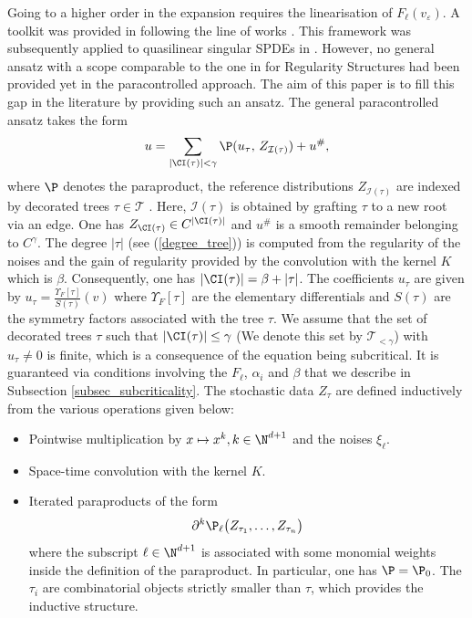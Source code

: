 \documentclass[11pt]{preprint}
\def\CT{\mathcal{T}}
\newcommand{\mcI}{\mathcal{I}}
\def\eps{\varepsilon}
\let\eps\varepsilon
\def\eqref#1{(\ref{#1})}
\begin{document}
	
	Going to a higher order in the expansion requires the linearisation of $F_\ell(v_{\eps})$. A toolkit was provided in \cite{BailleulBernicotHighOrder} following the line of works \cite{HeatKernelSPDE,SpacetimeParaproducts}. This framework was subsequently applied to quasilinear singular SPDEs in \cite{ParacontrolforQuasilinear}. However, no general ansatz with a scope comparable to the one in \cite{BCCH} for Regularity Structures had been provided yet in the paracontrolled approach. The aim of this paper is to fill this gap in the literature by providing such an ansatz. The general paracontrolled ansatz takes the form
	\begin{equation}\label{eq_ansatz0}
	u= \sum_{|\CI(\tau)| < \gamma } \P(u_\tau, \, Z_{\mcI(\tau)} ) + u^\#,
\end{equation}
	where $\P$ denotes the paraproduct, the reference distributions $Z_{\mathcal{I}(\tau)}$ are indexed by decorated trees $\tau \in \CT$ . Here,  $ \mathcal{I}(\tau) $ is obtained by grafting $\tau$ to a new root via an edge.
	One has $ Z_{\CI(\tau)} \in C^{|\CI(\tau)|}  $ and  $u^\#$ is a smooth remainder belonging to $C^{\gamma}$. The degree $|\tau|$ (see \eqref{degree_tree}) is computed from the regularity of the noises and the gain of regularity provided by the convolution with the kernel $K$ which is $\beta$. Consequently, one has $ |\CI(\tau) | = \beta + |\tau| $.
	The coefficients $u_{\tau}$ are given by $u_\tau = \frac{\Upsilon_F[\tau]}{S(\tau)}(v)$ where $ \Upsilon_F[\tau] $  are the elementary differentials and $S(\tau)$ are the symmetry factors associated with the tree $\tau$.   
	We assume that the set of decorated trees $ \tau $ such that $ |\CI(\tau)| \leq \gamma $ (We denote this set by $\CT_{< \gamma}$) with $u_{\tau} \neq 0$ is finite, which is a consequence of the equation being subcritical. It is guaranteed via conditions involving the $F_{\ell}$, $\alpha_i$ and $\beta$ that we describe in Subsection \ref{subsec_subcriticality}.
The stochastic data $Z_\tau$ are defined inductively from the various operations given below:
	\begin{itemize}
		\item Pointwise multiplication by $x \mapsto x^k, k \in \N^{d+1} $ and the noises $\xi_{\ell}$.
		\item Space-time convolution with the kernel $K$.
		\item Iterated paraproducts of the form
		\begin{equation*}
		\partial^k \P_\ell\big(Z_{\tau_1},\dots,Z_{\tau_n}\big)
		\end{equation*}
		where the subscript  $\ell \in \N^{d+1}$ is associated with some monomial weights inside the definition of the paraproduct. In particular, one has $ \P = \P_0 $. The $\tau_i$ are combinatorial objects strictly smaller than $\tau$, which provides the inductive structure. 
	\end{itemize}
	
\end{document}
